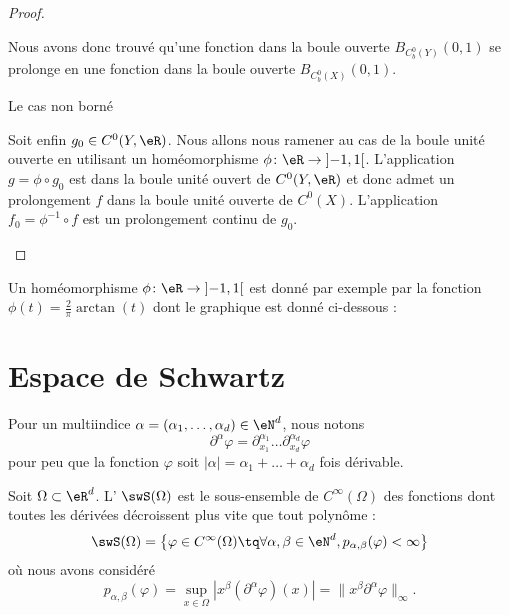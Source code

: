 \begin{proof}
\begin{subproof}
    Nous avons donc trouvé qu'une fonction dans la boule ouverte \( B_{C^0_b(Y)}(0,1)\) se prolonge en une fonction dans la boule ouverte \( B_{C^0_b(X)}(0,1)\).

\item[Le cas non borné]

Soit enfin \( g_0\in C^0(Y,\eR)\). Nous allons nous ramener au cas de la boule unité ouverte en utilisant un homéomorphisme \( \phi\colon \eR\to \mathopen] -1 , 1 \mathclose[\). L'application \( g=\phi\circ g_0\) est dans la boule unité ouvert de \( C^0(Y,\eR)\) et donc admet un prolongement \( f\) dans la boule unité ouverte de \( C^0(X)\). L'application \( f_0=\phi^{-1}\circ f\) est un prolongement continu de \( g_0\).

    \end{subproof}
\end{proof}

Un homéomorphisme \( \phi\colon \eR\to \mathopen] -1 , 1 \mathclose[\) est donné par exemple par la fonction \( \phi(t)=\frac{ 2 }{ \pi }\arctan(t)\) dont le graphique est donné ci-dessous :
\begin{center}
    
\end{center}

\section{Espace de Schwartz}

Pour un multiindice \( \alpha=(\alpha_1,\ldots, \alpha_d)\in \eN^d\), nous notons
\begin{equation}
    \partial^{\alpha}\varphi=\partial_{x_1}^{\alpha_1}\ldots\partial_{x_d}^{\alpha_d}\varphi
\end{equation}
pour peu que la fonction \( \varphi\) soit \( | \alpha |=\alpha_1+\ldots +\alpha_d\) fois dérivable.

\begin{definition}  \label{DefHHyQooK}
    Soit \( \Omega\subset\eR^d\). L' \( \swS(\Omega)\) est le sous-ensemble de \(  C^{\infty}(\Omega)\) des fonctions dont toutes les dérivées décroissent plus vite que tout polynôme :
    \begin{equation}
        \swS(\Omega)=\big\{   \varphi\in C^{\infty}(\Omega)\tq\forall \alpha,\beta\in \eN^d, p_{\alpha,\beta}(\varphi)<\infty   \big\}
    \end{equation}
    où nous avons considéré
    \begin{equation}    \label{EqOWdChCu}
        p_{\alpha,\beta}(\varphi)=\sup_{x\in \Omega}| x^{\beta}(\partial^{\alpha}\varphi)(x) |=\| x^{\beta}\partial^{\alpha}\varphi \|_{\infty}.
    \end{equation}
\end{definition}

